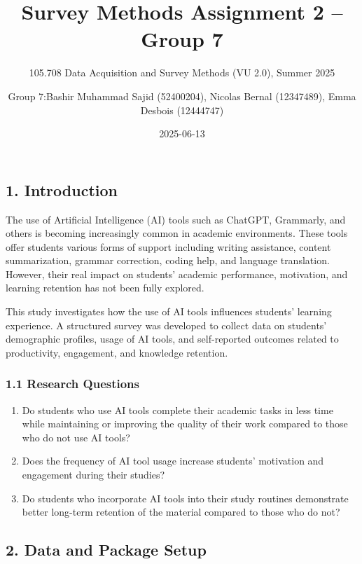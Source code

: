 \documentclass[
]{article}
\title{Survey Methods Assignment 2 -- Group 7}
\subtitle{105.708 Data Acquisition and Survey Methods (VU 2.0), Summer
2025}
\author{Group 7:Bashir Muhammad Sajid (52400204), Nicolas Bernal
(12347489), Emma Desbois (12444747)}
\date{2025-06-13}
\begin{document}
\maketitle

{
\setcounter{tocdepth}{3}
\tableofcontents
}
\subsection{1. Introduction}\label{introduction}

The use of Artificial Intelligence (AI) tools such as ChatGPT,
Grammarly, and others is becoming increasingly common in academic
environments. These tools offer students various forms of support
including writing assistance, content summarization, grammar correction,
coding help, and language translation. However, their real impact on
students' academic performance, motivation, and learning retention has
not been fully explored.

This study investigates how the use of AI tools influences students'
learning experience. A structured survey was developed to collect data
on students' demographic profiles, usage of AI tools, and self-reported
outcomes related to productivity, engagement, and knowledge retention.

\subsubsection{1.1 Research Questions}\label{research-questions}

\begin{enumerate}
\def\labelenumi{\arabic{enumi}.}
\item
  Do students who use AI tools complete their academic tasks in less
  time while maintaining or improving the quality of their work compared
  to those who do not use AI tools?
\item
  Does the frequency of AI tool usage increase students' motivation and
  engagement during their studies?
\item
  Do students who incorporate AI tools into their study routines
  demonstrate better long-term retention of the material compared to
  those who do not?
\end{enumerate}

\subsection{2. Data and Package Setup}\label{data-and-package-setup}
\end{document}
